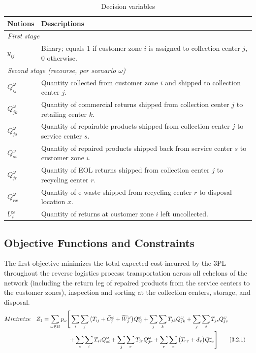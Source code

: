 \documentclass[11pt, a4paper]{article}
\begin{document}
\hypertarget{tab:Decision}{}
\begin{table}[!htb]
\footnotesize
\caption{Decision variables}
\label{tab:Decision}
\renewcommand{\arraystretch}{1.25}
\begin{tabular}{p{1.5cm}p{13.5cm}}
\toprule
Notions & Descriptions\\
\midrule
\multicolumn{2}{l}{\emph{First stage}} \\
\midrule
$y_{ij}$ & Binary; equals 1 if customer zone $i$ is assigned to collection center $j$, 0 otherwise. \\
\midrule
\multicolumn{2}{l}{\emph{Second stage (recourse, per scenario $\omega$)}} \\
\midrule
$Q_{ij}^{\omega}$ & Quantity collected from customer zone $i$ and shipped to collection center $j$. \\
$Q_{jk}^{\omega}$ & Quantity of commercial returns shipped from collection center $j$ to retailing center $k$. \\
$Q_{js}^{\omega}$ & Quantity of repairable products shipped from collection center $j$ to service center $s$. \\
$Q_{si}^{\omega}$ & Quantity of repaired products shipped back from service center $s$ to customer zone $i$. \\
$Q_{jr}^{\omega}$ & Quantity of EOL returns shipped from collection center $j$ to recycling center $r$. \\
$Q_{rx}^{\omega}$ & Quantity of e-waste shipped from recycling center $r$ to disposal location $x$. \\
$U_i^{\omega}$ & Quantity of returns at customer zone $i$ left uncollected. \\
\bottomrule
\end{tabular}
\end{table}
\protect\hypertarget{tab:Decision}{}{}


\subsection{Objective Functions and Constraints}
\label{objective-functions-and-constraints}
The first objective minimizes the total expected cost incurred by the 3PL throughout the reverse logistics process: transportation across all echelons of the network (including the return leg of repaired products from the service centers to the customer zones), inspection and sorting at the collection centers, storage, and disposal.
\begin{align}
    Minimize \hspace{10pt} Z_1 & = \sum_{\omega \in \Omega} p_{\omega} \Bigg[ \sum_i\sum_j \big(T_{ij}+\widetilde{C}_j^{\omega}+\widetilde{W}_j^{\omega}\big) Q_{ij}^{\omega} + \sum_j\sum_k T_{jk}Q_{jk}^{\omega} + \sum_j\sum_s T_{js}Q_{js}^{\omega} &&\notag\\
    & \hspace{45pt} + \sum_s\sum_i T_{si}Q_{si}^{\omega} + \sum_j\sum_r T_{jr}Q_{jr}^{\omega} + \sum_r\sum_x \big(T_{rx}+d_x\big) Q_{rx}^{\omega} \Bigg] \label{eqn-1}\tag{3.2.1}
\end{align}
\end{document}
